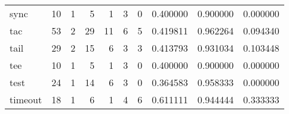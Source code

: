 \begin{tabular}{lrrrrrrrrr}
sync      &                                       10 &                                                  1 &                                                  5 &                                                  1 &                                                  3 &                                                  0 &                                           0.400000 &                               0.900000 &                             0.000000 \\
tac       &                                       53 &                                                  2 &                                                 29 &                                                 11 &                                                  6 &                                                  5 &                                           0.419811 &                               0.962264 &                             0.094340 \\
tail      &                                       29 &                                                  2 &                                                 15 &                                                  6 &                                                  3 &                                                  3 &                                           0.413793 &                               0.931034 &                             0.103448 \\
tee       &                                       10 &                                                  1 &                                                  5 &                                                  1 &                                                  3 &                                                  0 &                                           0.400000 &                               0.900000 &                             0.000000 \\
test      &                                       24 &                                                  1 &                                                 14 &                                                  6 &                                                  3 &                                                  0 &                                           0.364583 &                               0.958333 &                             0.000000 \\
timeout   &                                       18 &                                                  1 &                                                  6 &                                                  1 &                                                  4 &                                                  6 &                                           0.611111 &                               0.944444 &                             0.333333 \\

\end{tabular}
